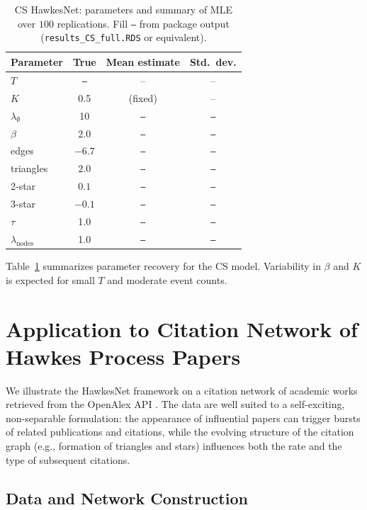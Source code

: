 \documentclass[12pt]{article}
\begin{document}
\begin{table}[tb]
    \centering
    \begin{tabular}{lccc}
        \toprule
        Parameter & True & Mean estimate & Std.\ dev. \\
        \midrule
        $T$ & \texttt{---} & -- & -- \\
        $K$ & 0.5 & (fixed) & -- \\
        \midrule
        $\lambda_{\emptyset}$ & 10 & \texttt{---} & \texttt{---} \\
        $\beta$ & 2.0 & \texttt{---} & \texttt{---} \\
        \midrule
        edges & $-6.7$ & \texttt{---} & \texttt{---} \\
        triangles & $2.0$ & \texttt{---} & \texttt{---} \\
        2-star & $0.1$ & \texttt{---} & \texttt{---} \\
        3-star & $-0.1$ & \texttt{---} & \texttt{---} \\
        $\tau$ & 1.0 & \texttt{---} & \texttt{---} \\
        $\lambda_{\text{nodes}}$ & 1.0 & \texttt{---} & \texttt{---} \\
        \midrule
    \end{tabular}
    \caption{CS HawkesNet: parameters and summary of MLE over $100$ replications. Fill \texttt{---} from package output (\texttt{results\_CS\_full.RDS} or equivalent).}
    \label{tab:CS_table}
\end{table}

Table~\ref{tab:CS_table} summarizes parameter recovery for the CS model. Variability in $\beta$ and $K$ is expected for small $T$ and moderate event counts.

\section{Application to Citation Network of Hawkes Process Papers}\label{sec:openalex}

We illustrate the HawkesNet framework on a citation network of academic works retrieved from the OpenAlex API \citep{openalex}. The data are well suited to a self-exciting, non-separable formulation: the appearance of influential papers can trigger bursts of related publications and citations, while the evolving structure of the citation graph (e.g., formation of triangles and stars) influences both the rate and the type of subsequent citations.

\subsection{Data and Network Construction}
\end{document}
